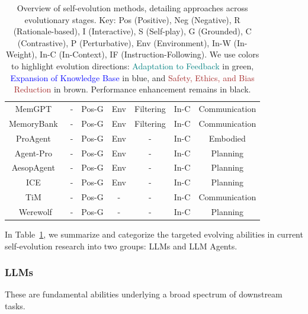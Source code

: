 \documentclass[sn-basic, Numbered]{sn-jnl}%
\theoremstyle{thmstyleone}%
\theoremstyle{thmstyletwo}%
\theoremstyle{thmstylethree}%
\begin{document}
\begin{table}
\begin{tabular}{ccccccc}
MemGPT~\cite{packer2023memgpt} & - & Pos-G & Env & Filtering & In-C & Communication \\
MemoryBank~\cite{zhong2024memorybank} & - & Pos-G & Env & Filtering & In-C & Communication \\
ProAgent~\cite{zhang2024proagent} & - & Pos-G & Env & - & In-C & Embodied \\
Agent-Pro~\cite{zhang2024agent} & - & Pos-G & Env & - & In-C & Planning \\
AesopAgent~\cite{wang2024aesopagent} & - & Pos-G & Env & - & In-C & Planning \\
ICE~\cite{qian2024investigate} & - & Pos-G & Env & - & In-C & Planning \\
TiM~\cite{liu2023think} & - & Pos-G & - & - & In-C & Communication \\
Werewolf \cite{xu2023exploring} & - & Pos-G & - & - & In-C & Planning \\
\bottomrule 
\end{tabular}
\caption{Overview of self-evolution methods, detailing approaches across evolutionary stages. Key: Pos (Positive), Neg (Negative), R (Rationale-based), I (Interactive), S (Self-play), G (Grounded), C (Contrastive), P (Perturbative), Env (Environment), In-W (In-Weight), In-C (In-Context), IF (Instruction-Following). We use colors to highlight evolution directions: \textcolor{teal}{Adaptation to Feedback} in green, \textcolor{blue}{Expansion of Knowledge Base} in blue, and \textcolor{brown}{Safety, Ethics, and Bias Reduction} in brown. Performance enhancement remains in black.
}
\label{tab:comparison} 
\end{table}

In Table~\ref{tab:comparison}, we summarize and categorize the targeted evolving abilities in current self-evolution research into two groups: LLMs and LLM Agents.

\subsubsection{LLMs}
These are fundamental abilities underlying a broad spectrum of downstream tasks. 
\end{document}
